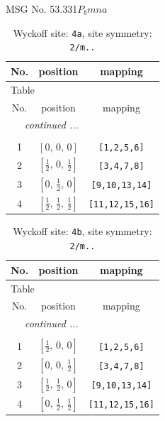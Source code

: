 \documentclass[fleqn,8pt]{jsarticle}
\begin{document}
\setcounter{MaxMatrixCols}{32}

\renewcommand{\tablename}{Table~}
\renewcommand{\figurename}{Figure~}
\begin{center}
\LARGE
MSG No. 53.331\quad$P_{b}mna$
\end{center}
\renewcommand{\arraystretch}{1.2}
\begin{longtable}{ccc}
\caption{Wyckoff site: {\tt 4a}, site symmetry: {\tt 2/m..}}
 \\
 \hline \hline
No. & position & mapping \\ \hline \endfirsthead

\multicolumn{2}{l}{\tablename\ \thetable{}} \\
 \hline \hline
No. & position & mapping \\ \hline \endhead

 \hline \hline
\multicolumn{2}{r}{\footnotesize\it continued ...} \\ \endfoot

 \hline \hline
\multicolumn{2}{r}{} \\ \endlastfoot

1 & $\left[ 0,\, 0,\, 0 \right]$ & {\tt [1,2,5,6]} \\ \hline
2 & $\left[ \frac{1}{2},\, 0,\, \frac{1}{2} \right]$ & {\tt [3,4,7,8]} \\ \hline
3 & $\left[ 0,\, \frac{1}{2},\, 0 \right]$ & {\tt [9,10,13,14]} \\ \hline
4 & $\left[ \frac{1}{2},\, \frac{1}{2},\, \frac{1}{2} \right]$ & {\tt [11,12,15,16]} \\
\end{longtable}
\renewcommand{\arraystretch}{1.2}
\begin{longtable}{ccc}
\caption{Wyckoff site: {\tt 4b}, site symmetry: {\tt 2/m..}}
 \\
 \hline \hline
No. & position & mapping \\ \hline \endfirsthead

\multicolumn{2}{l}{\tablename\ \thetable{}} \\
 \hline \hline
No. & position & mapping \\ \hline \endhead

 \hline \hline
\multicolumn{2}{r}{\footnotesize\it continued ...} \\ \endfoot

 \hline \hline
\multicolumn{2}{r}{} \\ \endlastfoot

1 & $\left[ \frac{1}{2},\, 0,\, 0 \right]$ & {\tt [1,2,5,6]} \\ \hline
2 & $\left[ 0,\, 0,\, \frac{1}{2} \right]$ & {\tt [3,4,7,8]} \\ \hline
3 & $\left[ \frac{1}{2},\, \frac{1}{2},\, 0 \right]$ & {\tt [9,10,13,14]} \\ \hline
4 & $\left[ 0,\, \frac{1}{2},\, \frac{1}{2} \right]$ & {\tt [11,12,15,16]} \\
\end{longtable}
\end{document}
